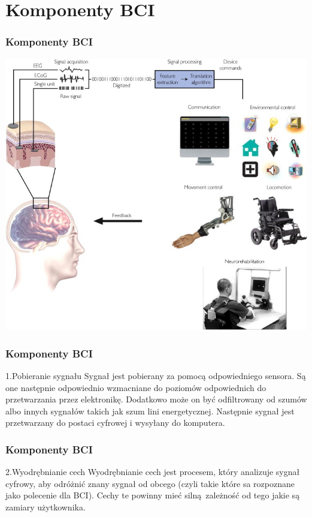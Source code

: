 \documentclass{beamer}
\begin{document}
\section{Komponenty BCI}

\begin{frame}
    \frametitle{Komponenty BCI}
    \begin{center}
        \includegraphics[scale=0.5]{comp.jpg}
    \end{center}    
\end{frame}

\begin{frame}
    \frametitle{Komponenty BCI}
    \begin{block}{1.Pobieranie sygnału}
        Sygnał jest pobierany za pomocą odpowiedniego sensora. Są one następnie odpowiednio wzmacniane do poziomów
        odpowiednich do przetwarzania przez elektronikę. Dodatkowo może on być odfiltrowany od szumów albo innych 
        sygnałów takich jak szum lini energetycznej. Następnie sygnał jest przetwarzany do postaci cyfrowej i wysyłany do komputera.   
    \end{block}
\end{frame}

\begin{frame}
    \frametitle{Komponenty BCI}
    \begin{block}{2.Wyodrębnianie cech}
        Wyodrębnianie cech jest procesem, który analizuje sygnał cyfrowy, aby odróżnić znany sygnał od obcego (czyli takie które sa rozpoznane jako polecenie
        dla BCI). Cechy te powinny mieć silną zależność od tego jakie są zamiary użytkownika. 
    \end{block}
\end{frame}
\end{document}
